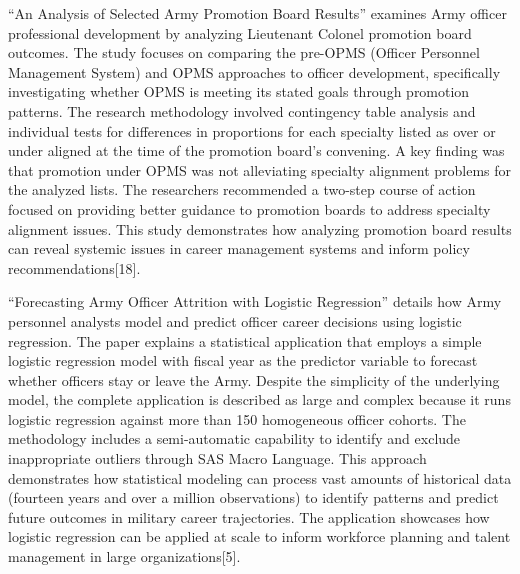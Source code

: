 \documentclass[
  letterpaper,
  DIV=11,
  numbers=noendperiod]{scrartcl}
\begin{document}
``An Analysis of Selected Army Promotion Board Results'' examines Army
officer professional development by analyzing Lieutenant Colonel
promotion board outcomes. The study focuses on comparing the pre-OPMS
(Officer Personnel Management System) and OPMS approaches to officer
development, specifically investigating whether OPMS is meeting its
stated goals through promotion patterns. The research methodology
involved contingency table analysis and individual tests for differences
in proportions for each specialty listed as over or under aligned at the
time of the promotion board's convening. A key finding was that
promotion under OPMS was not alleviating specialty alignment problems
for the analyzed lists. The researchers recommended a two-step course of
action focused on providing better guidance to promotion boards to
address specialty alignment issues. This study demonstrates how
analyzing promotion board results can reveal systemic issues in career
management systems and inform policy recommendations{[}18{]}.

``Forecasting Army Officer Attrition with Logistic Regression'' details
how Army personnel analysts model and predict officer career decisions
using logistic regression. The paper explains a statistical application
that employs a simple logistic regression model with fiscal year as the
predictor variable to forecast whether officers stay or leave the Army.
Despite the simplicity of the underlying model, the complete application
is described as large and complex because it runs logistic regression
against more than 150 homogeneous officer cohorts. The methodology
includes a semi-automatic capability to identify and exclude
inappropriate outliers through SAS Macro Language. This approach
demonstrates how statistical modeling can process vast amounts of
historical data (fourteen years and over a million observations) to
identify patterns and predict future outcomes in military career
trajectories. The application showcases how logistic regression can be
applied at scale to inform workforce planning and talent management in
large organizations{[}5{]}.
\end{document}
